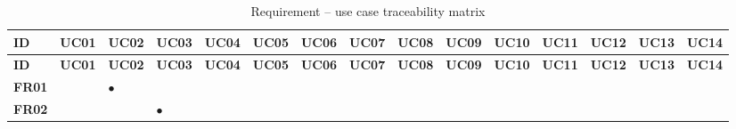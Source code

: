 {\setlength{\tabcolsep}{2.2pt}
\begin{longtable}{@{}P{1.2cm}>{\centering\arraybackslash}p{0.74cm}>{\centering\arraybackslash}p{0.74cm}>{\centering\arraybackslash}p{0.74cm}>{\centering\arraybackslash}p{0.74cm}>{\centering\arraybackslash}p{0.74cm}>{\centering\arraybackslash}p{0.74cm}>{\centering\arraybackslash}p{0.74cm}>{\centering\arraybackslash}p{0.74cm}>{\centering\arraybackslash}p{0.74cm}>{\centering\arraybackslash}p{0.74cm}>{\centering\arraybackslash}p{0.74cm}>{\centering\arraybackslash}p{0.74cm}>{\centering\arraybackslash}p{0.74cm}>{\centering\arraybackslash}p{0.74cm}@{}}
\caption{Requirement -- use case traceability matrix}\label{tab:traceuc}\\
\toprule
\scriptsize \textbf{ID} & \scriptsize \textbf{\scriptsize UC01} & \scriptsize \textbf{\scriptsize UC02} & \scriptsize \textbf{\scriptsize UC03} & \scriptsize \textbf{\scriptsize UC04} & \scriptsize \textbf{\scriptsize UC05} & \scriptsize \textbf{\scriptsize UC06} & \scriptsize \textbf{\scriptsize UC07} & \scriptsize \textbf{\scriptsize UC08} & \scriptsize \textbf{\scriptsize UC09} & \scriptsize \textbf{\scriptsize UC10} & \scriptsize \textbf{\scriptsize UC11} & \scriptsize \textbf{\scriptsize UC12} & \scriptsize \textbf{\scriptsize UC13} & \scriptsize \textbf{\scriptsize UC14}\\
\midrule
\endfirsthead
\toprule
\scriptsize \textbf{ID} & \scriptsize \textbf{\scriptsize UC01} & \scriptsize \textbf{\scriptsize UC02} & \scriptsize \textbf{\scriptsize UC03} & \scriptsize \textbf{\scriptsize UC04} & \scriptsize \textbf{\scriptsize UC05} & \scriptsize \textbf{\scriptsize UC06} & \scriptsize \textbf{\scriptsize UC07} & \scriptsize \textbf{\scriptsize UC08} & \scriptsize \textbf{\scriptsize UC09} & \scriptsize \textbf{\scriptsize UC10} & \scriptsize \textbf{\scriptsize UC11} & \scriptsize \textbf{\scriptsize UC12} & \scriptsize \textbf{\scriptsize UC13} & \scriptsize \textbf{\scriptsize UC14}\\
\midrule
\endhead
\bottomrule
\endlastfoot
\scriptsize \textbf{FR01} & \scriptsize  & \scriptsize $\bullet$ & \scriptsize  & \scriptsize  & \scriptsize  & \scriptsize  & \scriptsize  & \scriptsize  & \scriptsize  & \scriptsize  & \scriptsize  & \scriptsize  & \scriptsize  & \scriptsize \\
\scriptsize \textbf{FR02} & \scriptsize  & \scriptsize  & \scriptsize $\bullet$ & \scriptsize  & \scriptsize  & \scriptsize  & \scriptsize  & \scriptsize  & \scriptsize  & \scriptsize  & \scriptsize  & \scriptsize  & \scriptsize  & \scriptsize \\

\end{longtable}}
